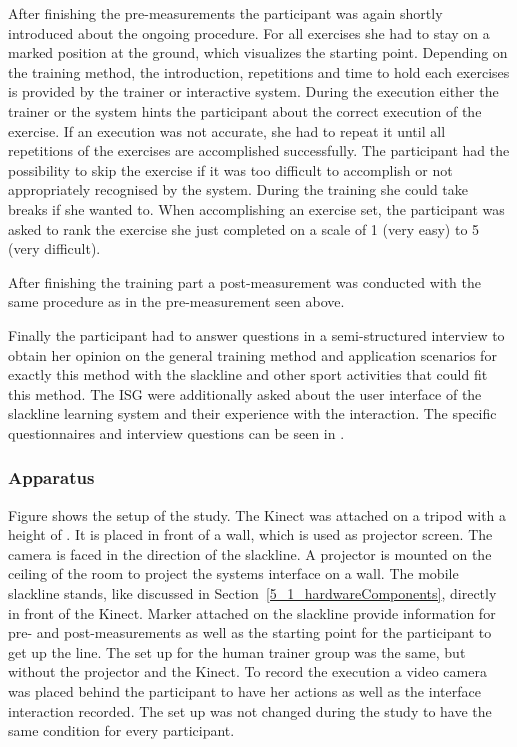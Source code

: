 After finishing the pre-measurements the participant was again shortly introduced about the ongoing procedure.
For all exercises she had to stay on a marked position at the ground, which visualizes the starting point.
Depending on the training method, the introduction, repetitions and time to hold each exercises is provided by the trainer or interactive system.
During the execution either the trainer or the system hints the participant about the correct execution of the exercise.
If an execution was not accurate, she had to repeat it until all repetitions of the exercises are accomplished successfully.
The participant had the possibility to skip the exercise if it was too difficult to accomplish or not appropriately recognised by the system.
During the training she could take breaks if she wanted to.
When accomplishing an exercise set, the participant was asked to rank the exercise she just completed on a scale of 1 (very easy) to 5 (very difficult).

After finishing the training part a post-measurement was conducted with the same procedure as in the pre-measurement seen above.

Finally the participant had to answer questions in a semi-structured interview to obtain her opinion on the general training method and application scenarios for exactly this method with the slackline and other sport activities that could fit this method.
The ISG were additionally asked about the user interface of the slackline learning system and their experience with the interaction.
The specific questionnaires and interview questions can be seen in .

\subsubsection{Apparatus}
Figure \todo{[figure]} shows the setup of the study.
The Kinect was attached on a tripod with a height of \todo{90 cm}.
It is placed in front of a wall, which is used as projector screen.
The camera is faced in the direction of the slackline.
A projector is mounted on the ceiling of the room to project the systems interface on a wall.
The mobile slackline stands, like discussed in Section~\ref{5_1_hardwareComponents}, directly in front of the Kinect.
Marker attached on the slackline provide information for pre- and post-measurements as well as the starting point for the participant to get up the line.
The set up for the human trainer group was the same, but without the projector and the Kinect.
To record the execution a video camera was placed behind the participant to have her actions as well as the interface interaction recorded.
The set up was not changed during the study to have the same condition for every participant.

